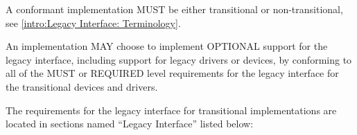 \label{sec:Conformance / Legacy Interface: Transitional Device and Transitional Driver Conformance}
A conformant implementation MUST be either transitional or
non-transitional, see \ref{intro:Legacy
Interface: Terminology}.

An implementation MAY choose to implement OPTIONAL support for the
legacy interface, including support for legacy drivers
or devices, by conforming to all of the MUST or
REQUIRED level requirements for the legacy interface
for the transitional devices and drivers.

The requirements for the legacy interface for transitional implementations
are located in sections named ``Legacy Interface'' listed below:
